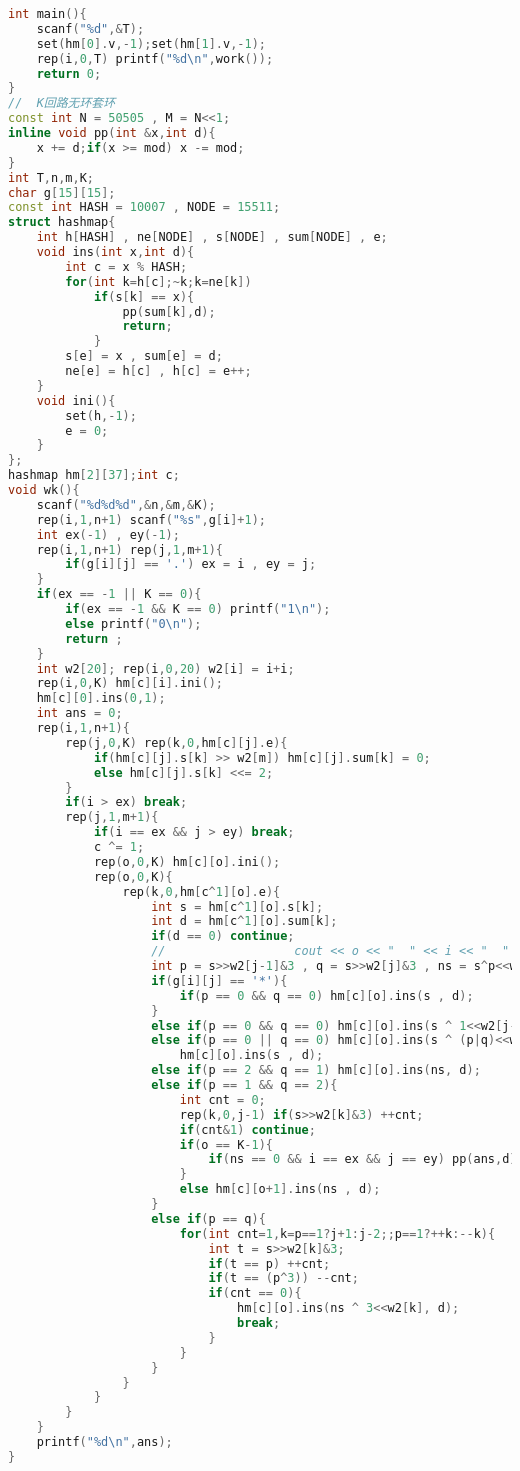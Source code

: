 \begin{lstlisting}[language=C++]
int main(){
    scanf("%d",&T);
    set(hm[0].v,-1);set(hm[1].v,-1);
    rep(i,0,T) printf("%d\n",work());
    return 0;
}
//	K回路无环套环
const int N = 50505 , M = N<<1;
inline void pp(int &x,int d){
    x += d;if(x >= mod) x -= mod;
}
int T,n,m,K;
char g[15][15];
const int HASH = 10007 , NODE = 15511;
struct hashmap{
    int h[HASH] , ne[NODE] , s[NODE] , sum[NODE] , e;
    void ins(int x,int d){
        int c = x % HASH;
        for(int k=h[c];~k;k=ne[k])
            if(s[k] == x){
                pp(sum[k],d);
                return;
            }
        s[e] = x , sum[e] = d;
        ne[e] = h[c] , h[c] = e++;
    }
    void ini(){
        set(h,-1);
        e = 0;
    }
};
hashmap hm[2][37];int c;
void wk(){
    scanf("%d%d%d",&n,&m,&K);
    rep(i,1,n+1) scanf("%s",g[i]+1);
    int ex(-1) , ey(-1);
    rep(i,1,n+1) rep(j,1,m+1){
        if(g[i][j] == '.') ex = i , ey = j;
    }
    if(ex == -1 || K == 0){
        if(ex == -1 && K == 0) printf("1\n");
        else printf("0\n");
        return ;
    }
    int w2[20]; rep(i,0,20) w2[i] = i+i;
    rep(i,0,K) hm[c][i].ini();
    hm[c][0].ins(0,1);
    int ans = 0;
    rep(i,1,n+1){
        rep(j,0,K) rep(k,0,hm[c][j].e){
            if(hm[c][j].s[k] >> w2[m]) hm[c][j].sum[k] = 0;
            else hm[c][j].s[k] <<= 2;
        }
        if(i > ex) break;
        rep(j,1,m+1){
            if(i == ex && j > ey) break;
            c ^= 1;
            rep(o,0,K) hm[c][o].ini();
            rep(o,0,K){
                rep(k,0,hm[c^1][o].e){
                    int s = hm[c^1][o].s[k];
                    int d = hm[c^1][o].sum[k];
                    if(d == 0) continue;
                    //					cout << o << "  " << i << "  " << j << "  " << bitset<10>(s) << "  " << d << endl;
                    int p = s>>w2[j-1]&3 , q = s>>w2[j]&3 , ns = s^p<<w2[j-1]^q<<w2[j];
                    if(g[i][j] == '*'){
                        if(p == 0 && q == 0) hm[c][o].ins(s , d);
                    }
                    else if(p == 0 && q == 0) hm[c][o].ins(s ^ 1<<w2[j-1] ^ 2<<w2[j] , d);
                    else if(p == 0 || q == 0) hm[c][o].ins(s ^ (p|q)<<w2[j-1] ^ (p|q)<<w2[j] , d) ,
                        hm[c][o].ins(s , d);
                    else if(p == 2 && q == 1) hm[c][o].ins(ns, d);
                    else if(p == 1 && q == 2){
                        int cnt = 0;
                        rep(k,0,j-1) if(s>>w2[k]&3) ++cnt;
                        if(cnt&1) continue;
                        if(o == K-1){
                            if(ns == 0 && i == ex && j == ey) pp(ans,d);
                        }
                        else hm[c][o+1].ins(ns , d);
                    }
                    else if(p == q){
                        for(int cnt=1,k=p==1?j+1:j-2;;p==1?++k:--k){
                            int t = s>>w2[k]&3;
                            if(t == p) ++cnt;
                            if(t == (p^3)) --cnt;
                            if(cnt == 0){
                                hm[c][o].ins(ns ^ 3<<w2[k], d);
                                break;
                            }
                        }
                    }
                }
            }
        }
    }
    printf("%d\n",ans);
}


\end{lstlisting}
